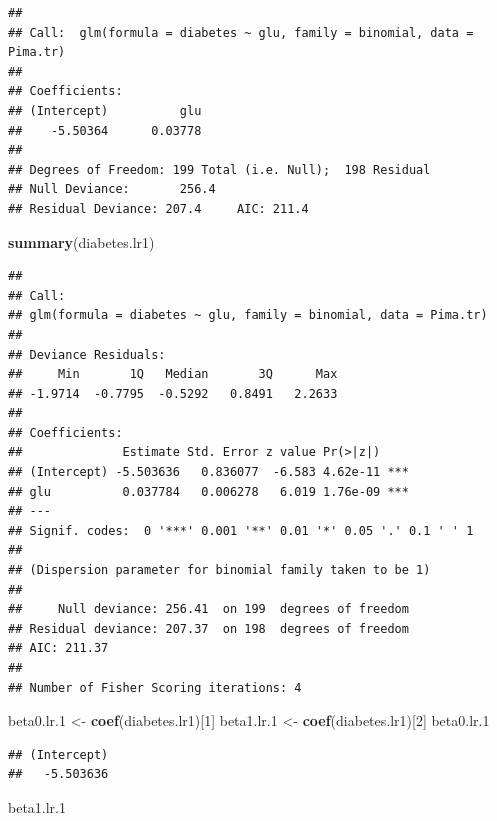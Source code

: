 \documentclass[]{article}
\newenvironment{Shaded}{\begin{snugshade}}{\end{snugshade}}
\newcommand{\KeywordTok}[1]{\textcolor[rgb]{0.13,0.29,0.53}{\textbf{#1}}}
\newcommand{\DecValTok}[1]{\textcolor[rgb]{0.00,0.00,0.81}{#1}}
\newcommand{\StringTok}[1]{\textcolor[rgb]{0.31,0.60,0.02}{#1}}
\newcommand{\NormalTok}[1]{#1}
\begin{document}
\begin{verbatim}
## 
## Call:  glm(formula = diabetes ~ glu, family = binomial, data = Pima.tr)
## 
## Coefficients:
## (Intercept)          glu  
##    -5.50364      0.03778  
## 
## Degrees of Freedom: 199 Total (i.e. Null);  198 Residual
## Null Deviance:       256.4 
## Residual Deviance: 207.4     AIC: 211.4
\end{verbatim}

\begin{Shaded}
\begin{Highlighting}[]
\KeywordTok{summary}\NormalTok{(diabetes.lr1)}
\end{Highlighting}
\end{Shaded}

\begin{verbatim}
## 
## Call:
## glm(formula = diabetes ~ glu, family = binomial, data = Pima.tr)
## 
## Deviance Residuals: 
##     Min       1Q   Median       3Q      Max  
## -1.9714  -0.7795  -0.5292   0.8491   2.2633  
## 
## Coefficients:
##              Estimate Std. Error z value Pr(>|z|)    
## (Intercept) -5.503636   0.836077  -6.583 4.62e-11 ***
## glu          0.037784   0.006278   6.019 1.76e-09 ***
## ---
## Signif. codes:  0 '***' 0.001 '**' 0.01 '*' 0.05 '.' 0.1 ' ' 1
## 
## (Dispersion parameter for binomial family taken to be 1)
## 
##     Null deviance: 256.41  on 199  degrees of freedom
## Residual deviance: 207.37  on 198  degrees of freedom
## AIC: 211.37
## 
## Number of Fisher Scoring iterations: 4
\end{verbatim}

\begin{Shaded}
\begin{Highlighting}[]
\NormalTok{beta0.lr.}\DecValTok{1}\NormalTok{ <-}\StringTok{ }\KeywordTok{coef}\NormalTok{(diabetes.lr1)[}\DecValTok{1}\NormalTok{]}
\NormalTok{beta1.lr.}\DecValTok{1}\NormalTok{ <-}\StringTok{ }\KeywordTok{coef}\NormalTok{(diabetes.lr1)[}\DecValTok{2}\NormalTok{]}
\NormalTok{beta0.lr.}\DecValTok{1}
\end{Highlighting}
\end{Shaded}

\begin{verbatim}
## (Intercept) 
##   -5.503636
\end{verbatim}

\begin{Shaded}
\begin{Highlighting}[]
\NormalTok{beta1.lr.}\DecValTok{1}
\end{Highlighting}
\end{Shaded}
\end{document}
